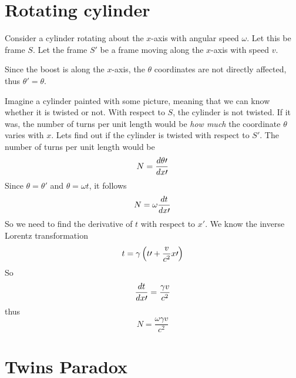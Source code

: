 \documentclass[oneside, 10pt, notitlepage]{book}
\begin{document}
\section{Rotating cylinder}

Consider a cylinder rotating about the \(x\)-axis with angular speed \(\omega\). Let this be frame \(S\). Let the frame \(S{\prime}\) be a frame moving along the \(x\)-axis with speed \(v\).  

Since the boost is along the \(x\)-axis, the \(\theta\) coordinates are not directly affected, thus \(\theta {\prime} = \theta\).  

Imagine a cylinder painted with some picture, meaning that we can know whether it is twisted or not. With respect to \(S\), the cylinder is not twisted. If it was, the number of turns per unit length would be \emph{how much} the coordinate \(\theta\) varies with \(x\). Lets find out if the cylinder is twisted with respect to \(S{\prime}\). The number of turns per unit length would be
\begin{equation}N=\dv{\theta {\prime}}{x{\prime}}\end{equation}
Since \(\theta=\theta{\prime}\) and \(\theta = \omega t\), it follows
\begin{equation}N = \omega \dv{t}{x{\prime}}\end{equation}
So we need to find the derivative of \(t\) with respect to \(x{\prime}\). We know the inverse Lorentz transformation
\begin{equation}t = \gamma\left(t{\prime} + \frac{v}{c^2}x{\prime}\right)\end{equation}
So
\begin{equation}\dv{t}{x{\prime}}=\frac{\gamma v}{c^2}\end{equation}
thus
\begin{equation}N = \frac{\omega \gamma v}{c^2}\end{equation}

\section{Twins Paradox}















\end{document}
